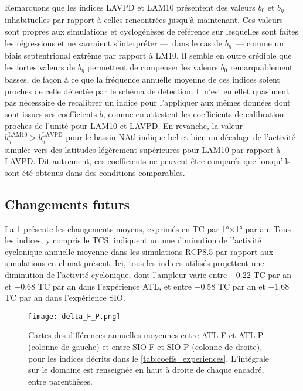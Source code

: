 \documentclass[../main.tex]{subfiles}
\begin{document}
Remarquons que les indices LAVPD et LAM10 présentent des valeurs $b_0$ et $b_\eta$ inhabituelles par rapport à celles rencontrées jusqu'à maintenant. Ces
valeurs sont propres aux simulations et cyclogénèses de référence sur lesquelles sont faites les régressions et ne sauraient s'interpréter ---~dans le cas de
$b_\eta$~--- comme un biais septentrional extrême par rapport à LM10. Il semble en outre crédible que les fortes valeurs de $b_\eta$ permettent de compenser les
valeurs $b_0$ remarquablement basses, de façon à ce que la fréquence annuelle moyenne de ces indices soient proches de celle détectée par le schéma de
détection. Il n'est en effet quasiment pas nécessaire de recalibrer un indice pour l'appliquer aux mêmes données dont sont issues ses coefficients $b$, comme en
attestent les coefficients de calibration proches de l'unité pour LAM10 et LAVPD. En revanche, la valeur $b_\eta^{\mathrm{LAM10}} > b_\eta^{\mathrm{LAVPD}}$
pour le bassin NAtl indique bel et bien un décalage de l'activité simulée vers des latitudes légèrement supérieures pour LAM10 par rapport à LAVPD. Dit
autrement, ces coefficients ne peuvent être comparés que lorsqu'ils sont été obtenus dans des conditions comparables.

\subsection{Changements futurs}

La \cref{fig:delta_F_P} présente les changements moyens, exprimés en TC par \ang{1}$\times$\ang{1} par an. Tous les indices, y compris le TCS, indiquent un une
diminution de l'activité cyclonique annuelle moyenne dans les simulations RCP8.5 par rapport aux simulations en climat présent. Ici, tous les indices utilisés
projettent une diminution de l'activité cyclonique, dont l'ampleur varie entre \num{-0.22} TC par an et \num{-0.68} TC par an dans l'expérience ATL, et entre
\num{-0.58} TC par an et \num{-1.68} TC par an dans l'expérience SIO.

\begin{figure}[htbp]
    \centering
    \texttt{[image: delta\_F\_P.png]}
    \caption{Cartes des différences annuelles moyennes entre ATL-F et ATL-P (colonne de gauche) et entre SIO-F et SIO-P (colonne de droite), pour les indices
    décrits dans le \cref{tab:coeffs_experiences}. L'intégrale sur le domaine est renseignée en haut à droite de chaque encadré, entre parenthèses.}
    \label{fig:delta_F_P}
\end{figure}
\end{document}

